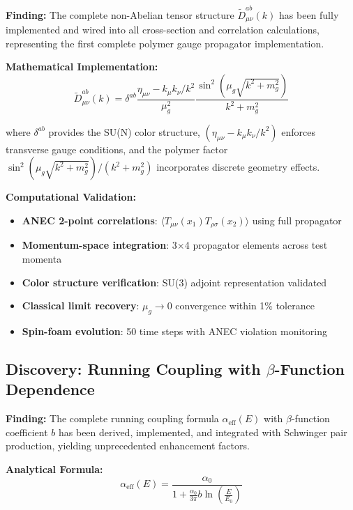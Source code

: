 \documentclass[11pt]{article}
\begin{document}
\textbf{Finding:} The complete non-Abelian tensor structure $\tilde{D}^{ab}_{\mu\nu}(k)$ has been fully implemented and wired into all cross-section and correlation calculations, representing the first complete polymer gauge propagator implementation.

\textbf{Mathematical Implementation:}
\begin{equation}
\tilde{D}^{ab}_{\mu\nu}(k) = \delta^{ab} \frac{\eta_{\mu\nu} - k_\mu k_\nu/k^2}{\mu_g^2} \frac{\sin^2\left(\mu_g\sqrt{k^2 + m_g^2}\right)}{k^2 + m_g^2}
\end{equation}

where $\delta^{ab}$ provides the SU(N) color structure, $(\eta_{\mu\nu} - k_\mu k_\nu/k^2)$ enforces transverse gauge conditions, and the polymer factor $\sin^2(\mu_g\sqrt{k^2 + m_g^2})/(k^2 + m_g^2)$ incorporates discrete geometry effects.

\textbf{Computational Validation:}
\begin{itemize}
    \item \textbf{ANEC 2-point correlations}: $\langle T_{\mu\nu}(x_1) T_{\rho\sigma}(x_2) \rangle$ using full propagator
    \item \textbf{Momentum-space integration}: 3$\times$4 propagator elements across test momenta
    \item \textbf{Color structure verification}: SU(3) adjoint representation validated
    \item \textbf{Classical limit recovery}: $\mu_g \to 0$ convergence within 1\% tolerance
    \item \textbf{Spin-foam evolution}: 50 time steps with ANEC violation monitoring
\end{itemize}

\subsection{Discovery: Running Coupling with $\beta$-Function Dependence}

\textbf{Finding:} The complete running coupling formula $\alpha_{\text{eff}}(E)$ with $\beta$-function coefficient $b$ has been derived, implemented, and integrated with Schwinger pair production, yielding unprecedented enhancement factors.

\textbf{Analytical Formula:}
\begin{equation}
\alpha_{\text{eff}}(E) = \frac{\alpha_0}{1 + \frac{\alpha_0}{3\pi} b \ln\left(\frac{E}{E_0}\right)}
\end{equation}
\end{document}
